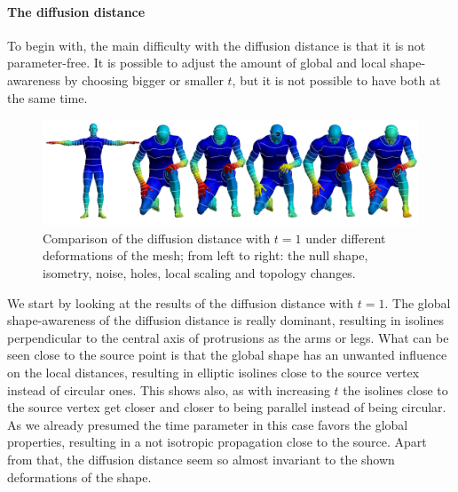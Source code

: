 \paragraph{The diffusion distance}
To begin with, the main difficulty with the diffusion distance is that it is not parameter-free.
It is possible to adjust the amount of global and local shape-awareness by choosing bigger or smaller $t$, but it is not possible to have both at the same time.
\begin{figure}[h]
	\centering
	\includegraphics[width = \textwidth]{../results/diffusion_big_isolines}
	\caption{Comparison of the diffusion distance with $t = 1$ under different deformations of the mesh; from left to right: the null shape, isometry, noise, holes, local scaling and topology changes.}
	\label{fig:diffusion_b_isolines}
\end{figure}
We start by looking at the results of the diffusion distance with $t=1$.
The global shape-awareness of the diffusion distance is really dominant, resulting in isolines perpendicular to the central axis of protrusions as the arms or legs.
What can be seen close to the source point is that the global shape has an unwanted influence on the local distances, resulting in elliptic isolines close to the source vertex instead of circular ones.
This shows also, as with increasing $t$ the isolines close to the source vertex get closer and closer to being parallel instead of being circular.
As we already presumed the time parameter in this case favors the global properties, resulting in a not isotropic propagation close to the source.
Apart from that, the diffusion distance seem so almost invariant to the shown deformations of the shape.

